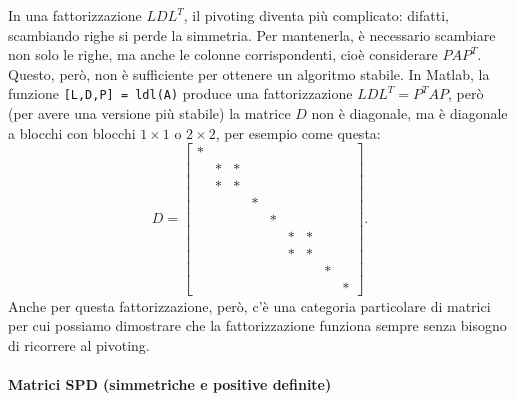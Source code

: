 \documentclass[a4paper]{report}
\theoremstyle{definiton}
\theoremstyle{remark}
\begin{document}
In una fattorizzazione $LDL^T$, il pivoting diventa più complicato: difatti, scambiando righe si perde la simmetria. Per mantenerla, è necessario scambiare non solo le righe, ma anche le colonne corrispondenti, cioè considerare $PAP^T$. Questo, però, non è sufficiente per ottenere un algoritmo stabile.
In Matlab, la funzione \lstinline{[L,D,P] = ldl(A)} produce una fattorizzazione $LDL^T = P^TAP$, però (per avere una versione più stabile) la matrice $D$ non è diagonale, ma è diagonale a blocchi con blocchi $1\times 1$ o $2\times 2$, per esempio come questa:
\[
    D = \begin{bmatrix}
        *\\
        & * & *\\
        & * & *\\
        & & & *\\
        && & & *\\
        & & & & & * & *\\
        & & & & & * & *\\
        & & & & & & & *\\
        & & & & & & & &*
    \end{bmatrix}.
\]
Anche per questa fattorizzazione, però, c'è una categoria particolare di matrici per cui possiamo dimostrare che la fattorizzazione funziona sempre senza bisogno di ricorrere al pivoting.

\paragraph{Matrici SPD (simmetriche e positive definite)}
\end{document}
